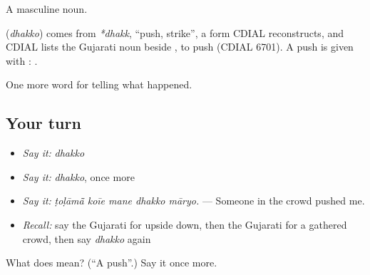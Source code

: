 A masculine noun.

\begin{cousinweb}
\textbf{} (\emph{dhakko}) comes from \emph{*dhakk}, \textquotedblleft{}push, strike\textquotedblright{}, a form CDIAL reconstructs, and CDIAL lists the Gujarati noun beside \textbf{}, to push (CDIAL 6701). A push is given with \textbf{}: \textbf{ }.
\end{cousinweb}

\begin{grammarlens}[title={What you've built}]
One more word for telling what happened.
\end{grammarlens}

\subsection*{Your turn}
\begin{itemize}
\raggedright
  \item \emph{Say it:} \emph{dhakko}
  \item \emph{Say it:} \emph{dhakko}, once more
  \item \emph{Say it:} \emph{ṭoḷāmā̃ koīe mane dhakko māryo.} — Someone in the crowd pushed me.
  \item \emph{Recall:} say the Gujarati for upside down, then the Gujarati for a gathered crowd, then say \emph{dhakko} again
\end{itemize}

\begin{tcolorbox}[breakable,colback=teal!4,colframe=teal!35!black,title={Before you move on}]
What does  mean? (\textquotedblleft{}A push\textquotedblright{}.) Say it once more.
\end{tcolorbox}

